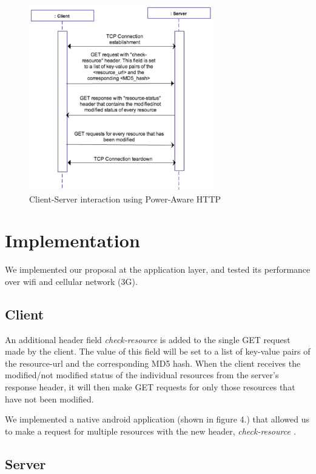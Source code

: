 \documentclass{sigplanconf}
\begin{document}
\begin{figure}[ht!]
\centering
\includegraphics[width=80mm]{proposal}
\caption{Client-Server interaction using Power-Aware HTTP }
\label{fig:sp_gd_mnist}
\end{figure}



\section{Implementation}

We implemented our proposal at the application layer, and tested its performance over wifi and cellular network (3G).

\subsection{Client}

An additional header field {\it check-resource} is added to the single GET request made by the client. 
The value of this field will be set to a list of key-value pairs of the resource-url and the corresponding MD5 hash.  When the client receives the modified/not modified status of the individual resources from the server's response header, it will then make GET requests for only those resources that have not been modified.

We implemented a native android application (shown in figure 4.) that allowed us to make a request for multiple resources with the new header, \it{check-resource} \rm. 


\subsection{Server}
\end{document}
